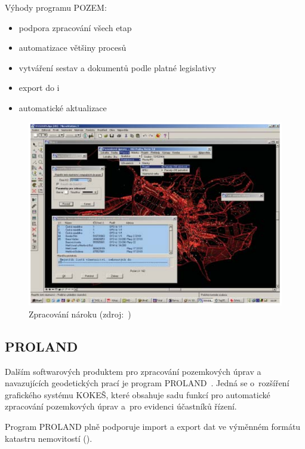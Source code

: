 Výhody programu POZEM:
	\begin{itemize}[leftmargin=1.5cm]
		\item podpora zpracování všech etap 
		\item automatizace většiny procesů 
		\item vytváření sestav a dokumentů podle platné legislativy
		\item export do  i~
		\item automatické aktualizace
	\end{itemize}

	\begin{figure}[H]
		\centering
		\includegraphics[width=.8\textwidth]{./pictures/pozem.png}
		\caption[Zpracování nároku]{Zpracování nároku (zdroj:~\citep{pozem})}
		\label{fig:pozem-obrazek}
 	\end{figure}

\subsection{PROLAND}
\label{proland}

Dalším softwarových produktem pro zpracování pozemkových úprav a navazujících geodetických prací je program PROLAND~\citep{proland}. Jedná se o~rozšíření grafického systému KOKEŠ, které obsahuje sadu funkcí pro automatické zpracování pozemkových úprav a~pro evidenci účastníků řízení.

Program PROLAND plně podporuje import a export dat ve výměnném formátu katastru nemovitostí ().

